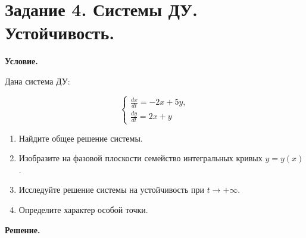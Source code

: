 \section{Задание 4. Системы ДУ. Устойчивость.}

\textbf{Условие.}

Дана система ДУ:

\[\begin{cases}\frac{dx}{dt} = -2x + 5y, \\ \frac{dy}{dt} = 2x + y\end{cases}\]

\begin{enumerate}
    \item Найдите общее решение системы.
    \item Изобразите на фазовой плоскости семейство интегральных кривых $y = y(x)$.
    \item Исследуйте решение системы на устойчивость при $t \to +\infty$.
    \item Определите характер особой точки.
\end{enumerate}

\vspace{10mm}
\textbf{Решение.}

